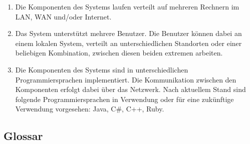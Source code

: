 \begin{enumerate}
	\item Die Komponenten des Systems laufen verteilt auf mehreren Rechnern im LAN, WAN und/oder Internet.
	\item Das System unterstützt mehrere Benutzer. Die Benutzer können dabei an einem lokalen System, verteilt an unterschiedlichen Standorten oder einer beliebigen Kombination, zwischen diesen beiden extremen arbeiten.
	\item Die Komponenten des Systems sind in unterschiedlichen Programmiersprachen implementiert. Die Kommunikation zwischen den Komponenten erfolgt dabei über das Netzwerk. Nach aktuellem Stand sind folgende Programmiersprachen in Verwendung oder für eine zukünftige Verwendung vorgesehen: Java, C\#, C++, Ruby.
\end{enumerate}

\subsection{Glossar}

